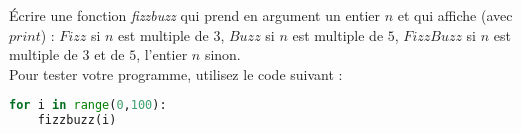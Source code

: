 \documentclass[11pt]{exam}
\begin{document}
\begin{questions}
\question Écrire une fonction \emph{fizzbuzz} qui prend en argument un entier $n$ et qui affiche (avec $print$) : $Fizz$ si $n$ est multiple de 3, $Buzz$ si $n$ est multiple de $5$, $FizzBuzz$ si $n$ est multiple de $3$ et de $5$, l'entier $n$ sinon.\\[1em]
Pour tester votre programme, utilisez le code suivant :
\begin{lstlisting}[language=Python]
for i in range(0,100):
    fizzbuzz(i)
\end{lstlisting}



\end{questions}
\end{document}
